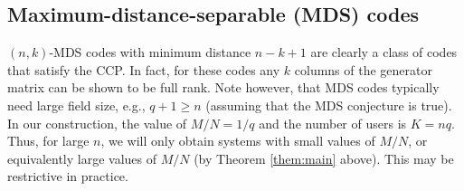 \documentclass[journal,twocolumn]{IEEEtran}
\theoremstyle{definition}
\newtheorem{theorem}{Theorem}
\newcommand{\bfG}{\mathbf{G}}
\newcommand{\aditya}[1]{\marginpar{+}{\bf Aditya's remark}: {\em #1}}
\begin{document}
\subsection{Maximum-distance-separable (MDS) codes}
\label{sec:MDS_cons}
$(n,k)$-MDS codes with minimum distance $n-k+1$ are clearly a class of codes that satisfy the CCP. In fact, for these codes any $k$ columns of the generator matrix can be shown to be full rank. Note however, that MDS codes typically need large field size, e.g., $q +1 \geq n$  (assuming that the MDS conjecture is true)\cite{RonRoth}. In our construction, the value of $M/N = 1/q$ and the number of users is $K = nq$. Thus, for large $n$, we will only obtain systems with small values of $M/N$, or equivalently large values of $M/N$ (by Theorem \ref{them:main} above). This may be restrictive in practice.

%


%
%
%
\end{document}

